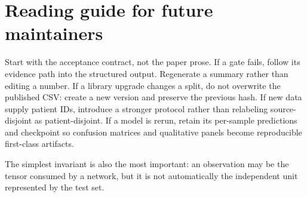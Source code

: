 \chapter{Reading guide for future maintainers}\label{s1:ch:app11_reading_guide_for_future_maintainers}

Start with the acceptance contract, not the paper prose. If a gate fails, follow its evidence path into the structured output. Regenerate a summary rather than editing a number. If a library upgrade changes a split, do not overwrite the published CSV: create a new version and preserve the previous hash. If new data supply patient IDs, introduce a stronger protocol rather than relabeling source-disjoint as patient-disjoint. If a model is rerun, retain its per-sample predictions and checkpoint so confusion matrices and qualitative panels become reproducible first-class artifacts.

The simplest invariant is also the most important: an observation may be the tensor consumed by a network, but it is not automatically the independent unit represented by the test set.
